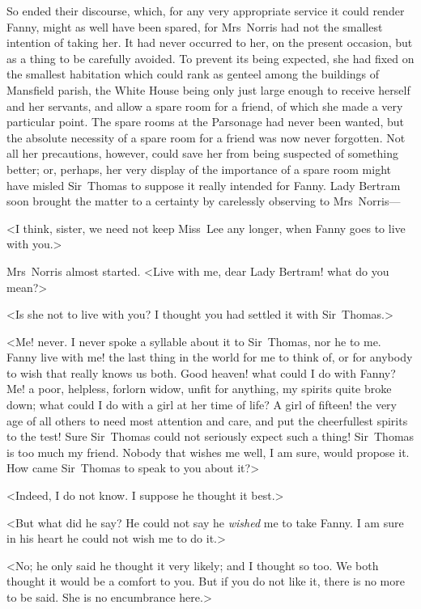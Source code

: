 So ended their discourse, which, for any very appropriate service it could render Fanny, might as well have been spared, for Mrs~Norris had not the smallest intention of taking her. It had never occurred to her, on the present occasion, but as a thing to be carefully avoided. To prevent its being expected, she had fixed on the smallest habitation which could rank as genteel among the buildings of Mansfield parish, the White House being only just large enough to receive herself and her servants, and allow a spare room for a friend, of which she made a very particular point. The spare rooms at the Parsonage had never been wanted, but the absolute necessity of a spare room for a friend was now never forgotten. Not all her precautions, however, could save her from being suspected of something better; or, perhaps, her very display of the importance of a spare room might have misled Sir~Thomas to suppose it really intended for Fanny. Lady Bertram soon brought the matter to a certainty by carelessly observing to Mrs~Norris—

<I think, sister, we need not keep Miss~Lee any longer, when Fanny goes to live with you.>

Mrs~Norris almost started. <Live with me, dear Lady Bertram! what do you mean?>

<Is she not to live with you? I thought you had settled it with Sir~Thomas.>

<Me! never. I never spoke a syllable about it to Sir~Thomas, nor he to me. Fanny live with me! the last thing in the world for me to think of, or for anybody to wish that really knows us both. Good heaven! what could I do with Fanny? Me! a poor, helpless, forlorn widow, unfit for anything, my spirits quite broke down; what could I do with a girl at her time of life? A girl of fifteen! the very age of all others to need most attention and care, and put the cheerfullest spirits to the test! Sure Sir~Thomas could not seriously expect such a thing! Sir~Thomas is too much my friend. Nobody that wishes me well, I am sure, would propose it. How came Sir~Thomas to speak to you about it?>

<Indeed, I do not know. I suppose he thought it best.>

<But what did he say? He could not say he \textit{wished}  me to take Fanny. I am sure in his heart he could not wish me to do it.>

<No; he only said he thought it very likely; and I thought so too. We both thought it would be a comfort to you. But if you do not like it, there is no more to be said. She is no encumbrance here.>


